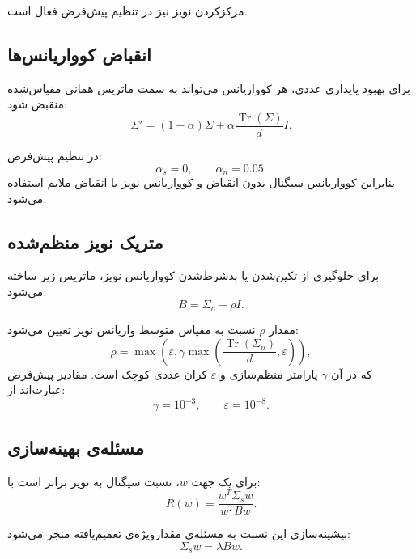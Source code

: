 \documentclass[a4paper,12pt]{article}
\begin{document}
مرکزکردن نویز نیز در تنظیم پیش‌فرض فعال است.

\subsection{انقباض کوواریانس‌ها}

برای بهبود پایداری عددی، هر کوواریانس می‌تواند به سمت ماتریس همانی مقیاس‌شده منقبض شود:
\begin{equation}
 \Sigma'
 =
 (1-\alpha)\Sigma
 +
 \alpha\frac{\operatorname{Tr}(\Sigma)}{d}I.
\end{equation}

در تنظیم پیش‌فرض:
\begin{equation}
 \alpha_s=0,
 \qquad
 \alpha_n=0.05.
\end{equation}
بنابراین کوواریانس سیگنال بدون انقباض و کوواریانس نویز با انقباض ملایم استفاده می‌شود.

\subsection{متریک نویز منظم‌شده}

برای جلوگیری از تکین‌شدن یا بدشرط‌شدن کوواریانس نویز، ماتریس زیر ساخته می‌شود:
\begin{equation}
 B=\Sigma_n+\rho I.
\end{equation}

مقدار $\rho$ نسبت به مقیاس متوسط واریانس نویز تعیین می‌شود:
\begin{equation}
 \rho
 =
 \max\left(
 \varepsilon,
 \gamma\max\left(\frac{\operatorname{Tr}(\Sigma_n)}{d},\varepsilon\right)
 \right),
\end{equation}
که در آن $\gamma$ پارامتر منظم‌سازی و $\varepsilon$ کران عددی کوچک است. مقادیر پیش‌فرض عبارت‌اند از:
\begin{equation}
 \gamma=10^{-3},
 \qquad
 \varepsilon=10^{-8}.
\end{equation}

\subsection{مسئله‌ی بهینه‌سازی}

برای یک جهت $w$، نسبت سیگنال به نویز برابر است با:
\begin{equation}
 R(w)
 =
 \frac{w^{T}\Sigma_sw}{w^{T}Bw}.
\end{equation}

بیشینه‌سازی این نسبت به مسئله‌ی مقدارویژه‌ی تعمیم‌یافته منجر می‌شود:
\begin{equation}
 \Sigma_sw
 =
 \lambda Bw.
\end{equation}
\end{document}

